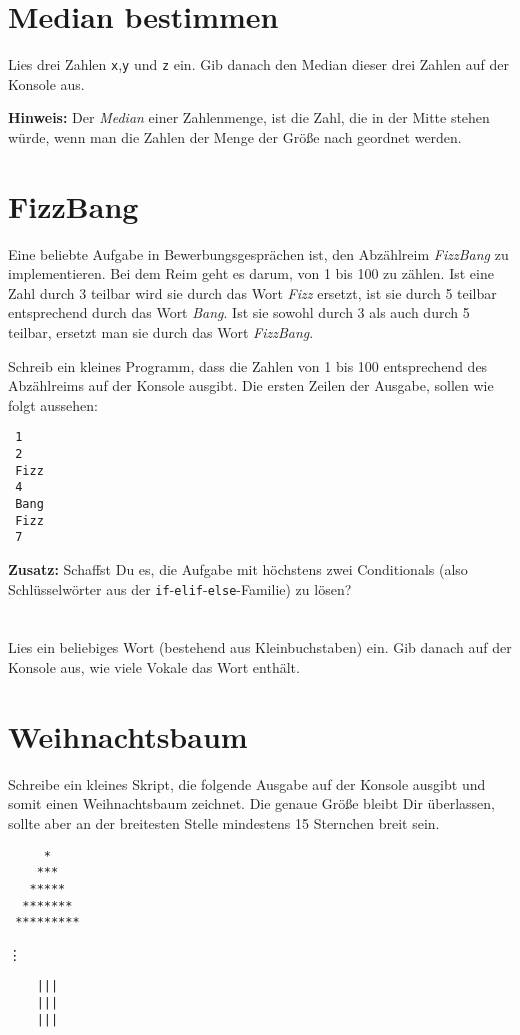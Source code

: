 \documentclass[a4paper]{article}
\begin{document}




\section{Median bestimmen}
Lies drei Zahlen \texttt{x},\texttt{y} und \texttt{z} ein. Gib danach den Median dieser drei Zahlen auf der Konsole aus.

\vspace{2pt}

{\footnotesize \textbf{Hinweis:} Der \emph{Median} einer Zahlenmenge, ist die Zahl, die in der Mitte stehen würde, wenn man die Zahlen der Menge der Größe nach geordnet werden. }


\section{FizzBang}
Eine beliebte Aufgabe in Bewerbungsgesprächen ist, den Abzählreim \emph{FizzBang} zu implementieren. Bei dem Reim geht es darum, von 1 bis 100 zu zählen. Ist eine Zahl durch 3 teilbar wird sie durch das Wort \emph{Fizz} ersetzt, ist sie durch 5 teilbar entsprechend durch das Wort \emph{Bang}. Ist sie sowohl durch 3 als auch durch 5 teilbar, ersetzt man sie durch das Wort \emph{FizzBang}.

 Schreib ein kleines Programm, dass die Zahlen von 1 bis 100 entsprechend des Abzählreims auf der Konsole ausgibt. Die ersten Zeilen der Ausgabe, sollen wie folgt aussehen: 

\vspace{0.2cm}
\begin{verbatim}
 1
 2
 Fizz
 4
 Bang
 Fizz
 7
\end{verbatim}
\textbf{Zusatz:} Schaffst Du es, die Aufgabe mit höchstens zwei Conditionals (also Schlüsselwörter aus der  \texttt{if}-\texttt{elif}-\texttt{else}-Familie) zu lösen? 

\section{}
Lies ein beliebiges Wort (bestehend aus Kleinbuchstaben) ein. Gib danach auf der Konsole aus, wie viele Vokale das Wort enthält. 

\section{Weihnachtsbaum}
Schreibe ein kleines Skript, die folgende Ausgabe auf der Konsole ausgibt und somit einen Weihnachtsbaum zeichnet. Die genaue Größe bleibt Dir überlassen, sollte aber an der breitesten Stelle mindestens 15 Sternchen breit sein. 

\vspace{0.2cm}

\begin{verbatim}
     *
    ***
   *****
  *******
 *********
\end{verbatim}
\phantom{*****.}\vdots
\begin{verbatim}
    |||
    |||
    |||
\end{verbatim}
\end{document}
